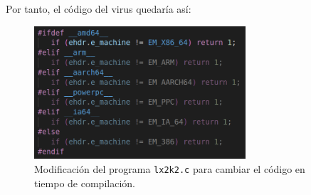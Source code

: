 \documentclass{article}
\begin{document}
\bigskip

Por tanto, el código del virus quedaría así:

\begin{figure}[H]
    \centering
    \includegraphics[width=0.7\textwidth]{imagenes/Captura desde 2022-11-25 17-21-11.png}
    \caption{Modificación del programa \texttt{lx2k2.c} para cambiar el código en tiempo de compilación.}
\end{figure}
\end{document}
